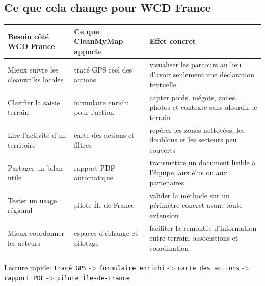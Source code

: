 \documentclass[
  french,
  10pt,
  a4paper,
  oneside]{article}
\newcounter{none} %
\begin{document}
\subsection{Ce que cela change pour WCD
France}\label{ce-que-cela-change-pour-wcd-france}

{\def\LTcaptype{none} %
\begin{longtable}[]{@{}
  >{\raggedright\arraybackslash}p{}
  >{\raggedright\arraybackslash}p{}
  >{\raggedright\arraybackslash}p{}@{}}
\toprule\noalign{}
\begin{minipage}[b]{\linewidth}\raggedright
Besoin côté WCD France
\end{minipage} & \begin{minipage}[b]{\linewidth}\raggedright
Ce que CleanMyMap apporte
\end{minipage} & \begin{minipage}[b]{\linewidth}\raggedright
Effet concret
\end{minipage} \\
\midrule\noalign{}
\endhead
\bottomrule\noalign{}
\endlastfoot
Mieux suivre les cleanwalks locales & tracé GPS réel des actions &
visualiser les parcours au lieu d'avoir seulement une déclaration
textuelle \\
Clarifier la saisie terrain & formulaire enrichi pour l'action & capter
poids, mégots, zones, photos et contexte sans alourdir le terrain \\
Lire l'activité d'un territoire & carte des actions et filtres & repérer
les zones nettoyées, les doublons et les secteurs peu couverts \\
Partager un bilan utile & rapport PDF automatique & transmettre un
document lisible à l'équipe, aux élus ou aux partenaires \\
Tester un usage régional & pilote Île-de-France & valider la méthode sur
un périmètre concret avant toute extension \\
Mieux coordonner les acteurs & espaces d'échange et pilotage & faciliter
la remontée d'information entre terrain, associations et coordination \\
\end{longtable}
}

\begin{tcolorbox}[enhanced jigsaw, arc=.35mm, bottomrule=.15mm, bottomtitle=1mm, breakable, colback=white, colbacktitle=quarto-callout-note-color!10!white, colframe=quarto-callout-note-color-frame, coltitle=black, left=2mm, leftrule=.75mm, opacityback=0, opacitybacktitle=0.6, rightrule=.15mm, title=\textcolor{quarto-callout-note-color}{\faInfo}\hspace{0.5em}{Note}, titlerule=0mm, toprule=.15mm, toptitle=1mm]

Lecture rapide: \texttt{tracé\ GPS} -\textgreater{}
\texttt{formulaire\ enrichi} -\textgreater{}
\texttt{carte\ des\ actions} -\textgreater{} \texttt{rapport\ PDF}
-\textgreater{} \texttt{pilote\ Île-de-France}

\end{tcolorbox}
\end{document}
